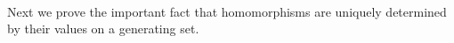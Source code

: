 \begin{code}
\AgdaSymbol{(}\AgdaSpace{}%
\AgdaSpace{}%
\AgdaSpace{}%
\AgdaSpace{}%
\AgdaSymbol{)}\AgdaSpace{}%
\AgdaSymbol{(}\AgdaSpace{}%
\AgdaSpace{}%
\AgdaSpace{}%
\AgdaSpace{}%
\AgdaSymbol{)}\AgdaSpace{}%
\<%
\\
%
\>[6]\AgdaSpace{}%
\AgdaSpace{}%
\AgdaSpace{}%
\AgdaSymbol{((}\AgdaSpace{}%
\AgdaSpace{}%
\AgdaSymbol{)}\AgdaSpace{}%
\AgdaSymbol{)}%
\>[27]\<%
\end{code}
\ccpad
Next we prove the important fact that homomorphisms are uniquely determined by their values on a generating set.
\ccpad
